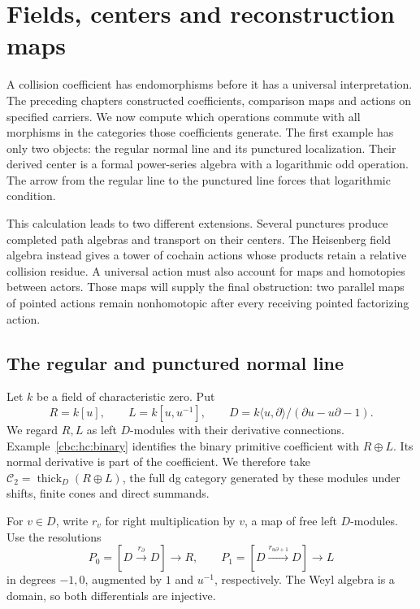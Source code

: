 \chapter{Fields, centers and reconstruction maps}
\label{cbc:chap:comparisons}

A collision coefficient has endomorphisms before it has a universal
interpretation.  The preceding chapters constructed coefficients,
comparison maps and actions on specified carriers.  We now compute
which operations commute with all morphisms in the categories those
coefficients generate.  The first example has only two objects: the
regular normal line and its punctured localization.  Their derived
center is a formal power-series algebra with a logarithmic odd
operation.  The arrow from the regular line to the punctured line
forces that logarithmic condition.

This calculation leads to two different extensions.  Several punctures
produce completed path algebras and transport on their centers.
The Heisenberg field algebra instead gives a tower of cochain actions
whose products retain a relative collision residue.  A universal action
must also account for maps and homotopies between actors.  Those maps
will supply the final obstruction: two parallel maps of pointed actions
remain nonhomotopic after every receiving pointed factorizing action.

\section{The regular and punctured normal line}
\label{cbc:rc:subsec:endomorphisms}

Let \(k\) be a field of characteristic zero.  Put
\[
 R=k[u],\qquad L=k[u,u^{-1}],\qquad
 D=k\langle u,\partial\rangle/(\partial u-u\partial-1).
\]
We regard \(R,L\) as left \(D\)-modules with their derivative connections.
Example~\ref{cbc:hc:binary} identifies the binary primitive coefficient
with \(R\oplus L\).  Its normal derivative is part of the coefficient.
We therefore take
\(\mathcal C_2=\operatorname{thick}_D(R\oplus L)\), the full dg category
generated by these modules under shifts, finite cones and direct summands.

For \(v\in D\), write \(r_v\) for right multiplication by \(v\), a map
of free left \(D\)-modules.  Use the resolutions
\begin{equation}\label{cbc:rc:eq:resolutions}
 P_0=[D\xrightarrow{r_\partial}D]\longrightarrow R,
 \qquad
 P_1=[D\xrightarrow{r_{u\partial+1}}D]\longrightarrow L
\end{equation}
in degrees \(-1,0\), augmented by \(1\) and \(u^{-1}\), respectively.
The Weyl algebra is a domain, so both differentials are injective.

